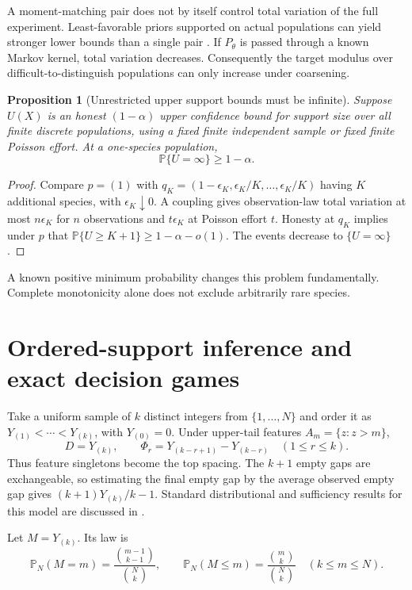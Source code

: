 \documentclass[11pt]{article}
\numberwithin{equation}{section}
\newtheorem{proposition}[proposition]{Proposition}
\theoremstyle{definition}
\theoremstyle{remark}
\newcommand{\Pp}{\mathbb P}
\begin{document}
A moment-matching pair does not by itself control total variation of the full experiment. Least-favorable priors supported on actual populations can yield stronger lower bounds than a single pair \cite{PolyanskiyWu2019}. If $P_\theta$ is passed through a known Markov kernel, total variation decreases. Consequently the target modulus over difficult-to-distinguish populations can only increase under coarsening.

\begin{proposition}[Unrestricted upper support bounds must be infinite]\label{prop:infiniteupper}
Suppose $U(X)$ is an honest $(1-\alpha)$ upper confidence bound for support size over all finite discrete populations, using a fixed finite independent sample or fixed finite Poisson effort. At a one-species population,
\[
 \Pp\{U=\infty\}\ge1-\alpha.
\]
\end{proposition}
\begin{proof}
Compare $p=(1)$ with $q_K=(1-\epsilon_K,\epsilon_K/K,\ldots,\epsilon_K/K)$ having $K$ additional species, with $\epsilon_K\downarrow0$. A coupling gives observation-law total variation at most $n\epsilon_K$ for $n$ observations and $t\epsilon_K$ at Poisson effort $t$. Honesty at $q_K$ implies under $p$ that $\Pp\{U\ge K+1\}\ge1-\alpha-o(1)$. The events decrease to $\{U=\infty\}$.
\end{proof}
A known positive minimum probability changes this problem fundamentally. Complete monotonicity alone does not exclude arbitrarily rare species.

\section{Ordered-support inference and exact decision games}\label{sec:tank}
Take a uniform sample of $k$ distinct integers from $\{1,\ldots,N\}$ and order it as $Y_{(1)}<\cdots<Y_{(k)}$, with $Y_{(0)}=0$. Under upper-tail features $A_m=\{z:z>m\}$,
\begin{equation}\label{eq:gaps}
 D=Y_{(k)},\qquad \Phi_r=Y_{(k-r+1)}-Y_{(k-r)}\quad(1\le r\le k).
\end{equation}
Thus feature singletons become the top spacing. The $k+1$ empty gaps are exchangeable, so estimating the final empty gap by the average observed empty gap gives $(k+1)Y_{(k)}/k-1$. Standard distributional and sufficiency results for this model are discussed in \cite{ONeill2025}.

Let $M=Y_{(k)}$. Its law is
\begin{equation}\label{eq:tanklaw}
 \Pp_N(M=m)=\frac{\binom{m-1}{k-1}}{\binom Nk},\qquad
 \Pp_N(M\le m)=\frac{\binom mk}{\binom Nk}\quad(k\le m\le N).
\end{equation}
\end{document}
